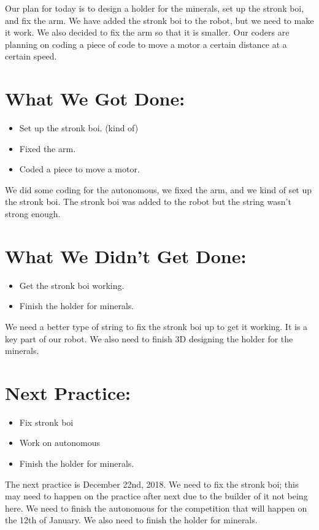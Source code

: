 \documentclass[12pt]{article}
\begin{document}
Our plan for today is to design a holder for the minerals, set up the stronk boi, and fix the arm. We have added the stronk boi to the robot, but we need to make it work. We also decided to fix the arm so that it is smaller.  Our coders are planning on coding a piece of code to move a motor a certain distance at a certain speed.

\section{What We Got Done:} 
\begin{itemize}
	\item Set up the stronk boi. (kind of)
	\item Fixed the arm.
	\item Coded a piece to move a motor.
\end{itemize}

We did some coding for the autonomous, we fixed the arm, and we kind of set up the stronk boi. The stronk boi was added to the robot but the string wasn't strong enough.

\section{What We Didn't Get Done:} 
\begin{itemize}
	\item Get the stronk boi working.
	\item Finish the holder for minerals.
\end{itemize}

We need a better type of string to fix the stronk boi up to get it working. It is a key part of our robot. We also need to finish 3D designing the holder for the minerals.

\section{Next Practice:}
\begin{itemize}
	\item Fix stronk boi
	\item Work on autonomous
	\item Finish the holder for minerals.
\end{itemize}

The next practice is December 22nd, 2018.
We need to fix the stronk boi; this may need to happen on the practice after next due to the builder of it not being here. We need to finish the autonomous for the competition that will happen on the 12th of January. We also need to finish the holder for minerals.
\end{document}
